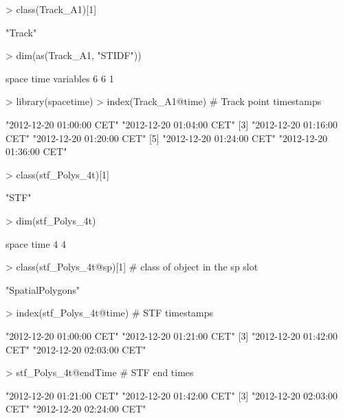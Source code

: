 \documentclass[12pt, oneside, a4paper]{scrbook}
\begin{document}
\begin{small}
\begin{Schunk}
\begin{Sinput}
> class(Track_A1)[1]
\end{Sinput}
\begin{Soutput}
[1] "Track"
\end{Soutput}
\begin{Sinput}
> dim(as(Track_A1, "STIDF"))
\end{Sinput}
\begin{Soutput}
    space      time variables 
        6         6         1 
\end{Soutput}
\begin{Sinput}
> library(spacetime)
> index(Track_A1@time) # Track point timestamps
\end{Sinput}
\begin{Soutput}
[1] "2012-12-20 01:00:00 CET" "2012-12-20 01:04:00 CET"
[3] "2012-12-20 01:16:00 CET" "2012-12-20 01:20:00 CET"
[5] "2012-12-20 01:24:00 CET" "2012-12-20 01:36:00 CET"
\end{Soutput}
\begin{Sinput}
> class(stf_Polys_4t)[1]
\end{Sinput}
\begin{Soutput}
[1] "STF"
\end{Soutput}
\begin{Sinput}
> dim(stf_Polys_4t)
\end{Sinput}
\begin{Soutput}
space  time 
    4     4 
\end{Soutput}
\begin{Sinput}
> class(stf_Polys_4t@sp)[1] # class of object in the sp slot
\end{Sinput}
\begin{Soutput}
[1] "SpatialPolygons"
\end{Soutput}
\begin{Sinput}
> index(stf_Polys_4t@time) # STF timestamps
\end{Sinput}
\begin{Soutput}
[1] "2012-12-20 01:00:00 CET" "2012-12-20 01:21:00 CET"
[3] "2012-12-20 01:42:00 CET" "2012-12-20 02:03:00 CET"
\end{Soutput}
\begin{Sinput}
> stf_Polys_4t@endTime # STF end times
\end{Sinput}
\begin{Soutput}
[1] "2012-12-20 01:21:00 CET" "2012-12-20 01:42:00 CET"
[3] "2012-12-20 02:03:00 CET" "2012-12-20 02:24:00 CET"
\end{Soutput}
\end{Schunk}
\end{small}
\end{document}
